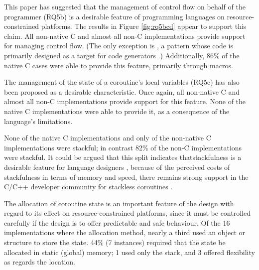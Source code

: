 This paper has suggested that the management of control flow on behalf of the programmer (RQ5b) is a desirable feature of programming languages on resource-constrained platforms. The results in Figure \ref{fig:rq5bcd} appear to support this claim. All non-native C and almost all non-C implementations provide support for managing control flow. (The only exception is \DIFdelbegin {}\DIFdelend \DIFaddbegin {}\DIFaddend , a pattern whose code is primarily designed as a target for code generators \DIFaddbegin {}\DIFaddend .) Additionally, 86\% of the native C cases were able to provide this feature, primarily through macros.

The management of the state of a coroutine’s local variables (RQ5c) has also been proposed as a desirable characteristic.  Once again, all non-native C and almost all non-C implementations provide support for this feature. None of the native C implementations were able to provide it, as a consequence of the language’s limitations.

None of the native C implementations and only \DIFdelbegin {}\DIFdelend \DIFaddbegin {}\DIFaddend of the non-native C implementations were stackful; in contrast 82\% of the non-C implementations were stackful. It could be argued that this split indicates that\DIFaddbegin {}\DIFaddend stackfulness is a desirable feature for language designers \DIFdelbegin {}\DIFdelend \DIFaddbegin {}\DIFaddend , because of the perceived costs of stackfulness in terms of memory and speed, there remains strong support in the C/C++ developer community for stackless coroutines \cite{Dunkels2006}.

The allocation of coroutine state is an important feature of the design with regard to its effect on resource-constrained platforms, since it must be controlled carefully if the design is to offer predictable and safe behaviour. Of the 16 implementations where \DIFaddbegin {}\DIFaddend the allocation method\DIFdelbegin {}\DIFdelend , nearly a third used an object or structure to store the state. 44\% (7 instances) required that the state be allocated in static (global) memory; 1 used only the stack, and 3 offered flexibility as regards the location.

